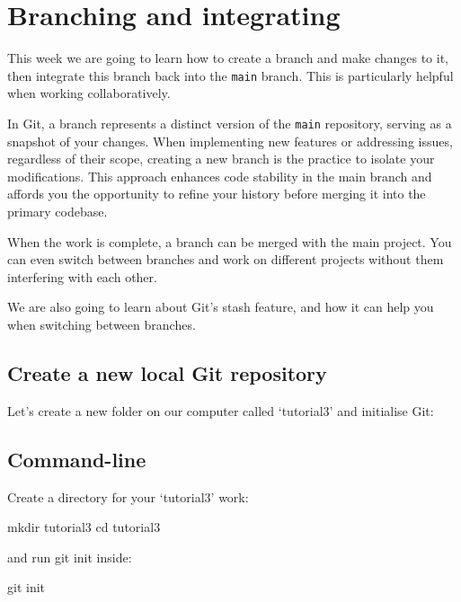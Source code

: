 \documentclass[
  letterpaper,
  DIV=11,
  numbers=noendperiod]{scrartcl}
\newenvironment{Shaded}{\begin{snugshade}}{\end{snugshade}}
\newcommand{\BuiltInTok}[1]{\textcolor[rgb]{0.00,0.23,0.31}{#1}}
\newcommand{\FunctionTok}[1]{\textcolor[rgb]{0.28,0.35,0.67}{#1}}
\newcommand{\NormalTok}[1]{\textcolor[rgb]{0.00,0.23,0.31}{#1}}
\begin{document}
\section{Branching and integrating}\label{branching-and-integrating}

This week we are going to learn how to create a branch and make changes
to it, then integrate this branch back into the \texttt{main} branch.
This is particularly helpful when working collaboratively.

In Git, a branch represents a distinct version of the \texttt{main}
repository, serving as a snapshot of your changes. When implementing new
features or addressing issues, regardless of their scope, creating a new
branch is the practice to isolate your modifications. This approach
enhances code stability in the main branch and affords you the
opportunity to refine your history before merging it into the primary
codebase.

When the work is complete, a branch can be merged with the main project.
You can even switch between branches and work on different projects
without them interfering with each other.

We are also going to learn about Git's stash feature, and how it can
help you when switching between branches.

\subsection{Create a new local Git
repository}\label{create-a-new-local-git-repository}

Let's create a new folder on our computer called `tutorial3' and
initialise Git:

\subsection{Command-line}

Create a directory for your `tutorial3' work:

\begin{Shaded}
\begin{Highlighting}[]
\FunctionTok{mkdir}\NormalTok{ tutorial3}
\BuiltInTok{cd}\NormalTok{ tutorial3}
\end{Highlighting}
\end{Shaded}

and run git init inside:

\begin{Shaded}
\begin{Highlighting}[]
\FunctionTok{git}\NormalTok{ init}
\end{Highlighting}
\end{Shaded}
\end{document}
